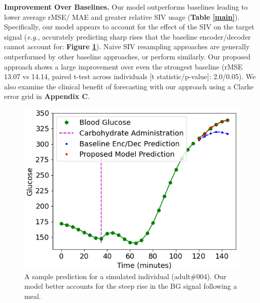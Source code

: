 \documentclass[letterpaper]{article}
\begin{document}
\textbf{Improvement Over Baselines.} Our model outperforms baselines leading to lower average rMSE/ MAE and greater relative SIV usage (\textbf{Table \ref{main}}). Specifically, our model appears to account for the effect of the SIV on the target signal (\textit{e.g.}, accurately predicting sharp rises that the baseline encoder/decoder cannot account for: \textbf{Figure \ref{fig:sampplot}}). Naive SIV resampling approaches are generally outperformed by other baseline approaches, or perform similarly. Our proposed approach shows a large improvement over even the strongest baseline (rMSE 13.07 vs 14.14, paired t-test across individuals [t statistic/p-value]: 2.0/0.05).  We also examine the clinical benefit of forecasting with our approach using a Clarke error grid in \textbf{Appendix C}.

\begin{figure}[t]
  \centering
\hspace*{-.3cm}  \includegraphics[height=1.7 in]{91.png}
\caption{A sample prediction for a simulated individual (adult\#004). Our model better accounts for the steep rise in the BG signal following a meal.}\label{fig:sampplot}
\end{figure}
\end{document}
